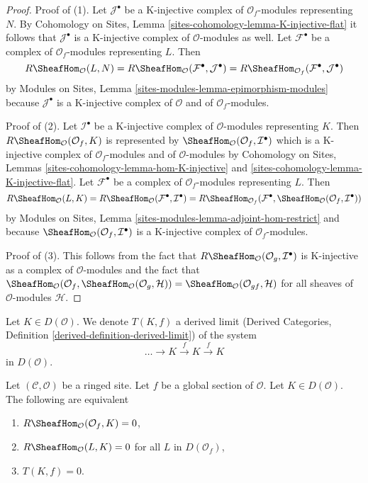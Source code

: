 \begin{proof}
Proof of (1). Let $\mathcal{J}^\bullet$ be a K-injective complex of
$\mathcal{O}_f$-modules representing $N$. By Cohomology on Sites, Lemma
\ref{sites-cohomology-lemma-K-injective-flat} it follows that
$\mathcal{J}^\bullet$ is a K-injective complex of
$\mathcal{O}$-modules as well. Let $\mathcal{F}^\bullet$ be a complex of
$\mathcal{O}_f$-modules representing $L$. Then
$$
R\SheafHom_\mathcal{O}(L, N) =
R\SheafHom_\mathcal{O}(\mathcal{F}^\bullet, \mathcal{J}^\bullet) =
R\SheafHom_{\mathcal{O}_f}(\mathcal{F}^\bullet, \mathcal{J}^\bullet)
$$
by
Modules on Sites, Lemma \ref{sites-modules-lemma-epimorphism-modules}
because $\mathcal{J}^\bullet$ is a K-injective complex of $\mathcal{O}$
and of $\mathcal{O}_f$-modules.

\medskip\noindent
Proof of (2). Let $\mathcal{I}^\bullet$ be a K-injective complex of
$\mathcal{O}$-modules representing $K$.
Then $R\SheafHom_\mathcal{O}(\mathcal{O}_f, K)$ is represented by
$\SheafHom_\mathcal{O}(\mathcal{O}_f, \mathcal{I}^\bullet)$ which is
a K-injective complex of $\mathcal{O}_f$-modules and of
$\mathcal{O}$-modules by
Cohomology on Sites, Lemmas \ref{sites-cohomology-lemma-hom-K-injective} and
\ref{sites-cohomology-lemma-K-injective-flat}.
Let $\mathcal{F}^\bullet$ be a complex of $\mathcal{O}_f$-modules
representing $L$. Then
$$
R\SheafHom_\mathcal{O}(L, K) =
R\SheafHom_\mathcal{O}(\mathcal{F}^\bullet, \mathcal{I}^\bullet) =
R\SheafHom_{\mathcal{O}_f}(\mathcal{F}^\bullet,
\SheafHom_\mathcal{O}(\mathcal{O}_f, \mathcal{I}^\bullet))
$$
by Modules on Sites, Lemma \ref{sites-modules-lemma-adjoint-hom-restrict}
and because $\SheafHom_\mathcal{O}(\mathcal{O}_f, \mathcal{I}^\bullet)$ is a
K-injective complex of $\mathcal{O}_f$-modules.

\medskip\noindent
Proof of (3). This follows from the fact that
$R\SheafHom_\mathcal{O}(\mathcal{O}_g, \mathcal{I}^\bullet)$
is K-injective as a complex of $\mathcal{O}$-modules and the fact that
$\SheafHom_\mathcal{O}(\mathcal{O}_f,
\SheafHom_\mathcal{O}(\mathcal{O}_g, \mathcal{H})) = 
\SheafHom_\mathcal{O}(\mathcal{O}_{gf}, \mathcal{H})$
for all sheaves of $\mathcal{O}$-modules $\mathcal{H}$.
\end{proof}

\noindent
Let $K \in D(\mathcal{O})$. We denote
$T(K, f)$ a derived limit (Derived Categories, Definition
\ref{derived-definition-derived-limit}) of the system
$$
\ldots \to K \xrightarrow{f} K \xrightarrow{f} K
$$
in $D(\mathcal{O})$.

\begin{lemma}
\label{lemma-hom-from-Af}
Let $(\mathcal{C}, \mathcal{O})$ be a ringed site. Let $f$ be a global
section of $\mathcal{O}$. Let $K \in D(\mathcal{O})$.
The following are equivalent
\begin{enumerate}
\item $R\SheafHom_\mathcal{O}(\mathcal{O}_f, K) = 0$,
\item $R\SheafHom_\mathcal{O}(L, K) = 0$ for all $L$ in $D(\mathcal{O}_f)$,
\item $T(K, f) = 0$.
\end{enumerate}
\end{lemma}

